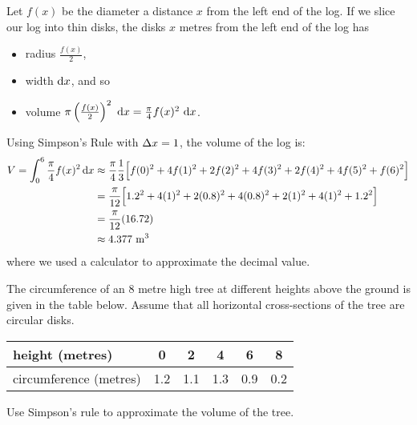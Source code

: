 \begin{solution}
 Let $f(x)$ be the diameter a distance $x$ from the left end of
the log.
If we slice our log into thin disks, the disks $x$ metres from the left end of the log has
\begin{itemize}
\item radius $\frac{f(x)}{2}$,
\item width $\mathrm{d}x$, and so
\item volume $\pi\left(\frac{f(x)}{2}\right)^2~\mathrm{d}x=\frac{\pi}{4}f(x)^2~\mathrm{d}x$.
\end{itemize}

\begin{center}
\end{center}

Using Simpson's Rule with $\Delta
x=1$,
the volume
of the log is:
\begin{align*}
V=\int_0^6 \frac{\pi}{4}f(x)^2\,\mathrm{d}x
&\approx\frac{\pi}{4}\frac{1}{3}
\Big[f(0)^2+4f(1)^2+2f(2)^2+4f(3)^2+2f(4)^2+4f(5)^2+f(6)^2\Big]\\
&=\frac{\pi}{12}
\Big[1.2^2+4(1)^2+2(0.8)^2+4(0.8)^2+2(1)^2+4(1)^2+1.2^2\Big]\\
&=\frac{\pi}{12}(16.72)\\
&\approx4.377\ {\rm m}^3
\end{align*}
where we used a calculator to approximate the decimal value.
\end{solution}

\begin{question}[1998A]
 The circumference of an 8 metre high tree at different heights
above the ground is given in the table below. Assume that all horizontal
cross-sections of the tree are circular disks.

\renewcommand{\arraystretch}{1.1}
\begin{center}
     \begin{tabular}{|l|c|c|c|c|c|}
          \hline
          height (metres) &0&2&4&6&8  \\
          \hline
          circumference (metres) &1.2&1.1&1.3&0.9&0.2\\
          \hline
     \end{tabular}
\end{center}
\renewcommand{\arraystretch}{1.0}

\noindent Use Simpson's rule to approximate the volume of the tree.
\end{question}

